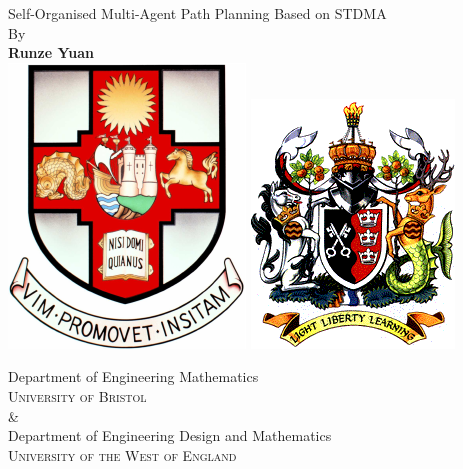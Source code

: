 \begin{titlepage}
    \begin{center}
        \vspace*{1cm}
        {\huge
        Self-Organised Multi-Agent Path Planning Based on STDMA
        }
        \vspace{0.5cm}
        \\
        {\large By}
        \\
        \vspace{0.5cm}
        \textbf{Runze Yuan}%
   		\vspace{1.5cm}
        \\
        \vspace{0.25cm}
       \includegraphics[scale=0.6]{logos/bristolcrest_colour.pdf}
        \hspace{5mm}
        \includegraphics[scale=0.35]{logos/UWE_insignia.png}

        \vspace{10mm}
        {\large Department of Engineering Mathematics\\
        \textsc{University of Bristol}}
        \\
        \&
        \\
        {\large Department of Engineering Design and Mathematics\\
        \textsc{University of the West of England}}\\


\end{center}
\end{titlepage}
